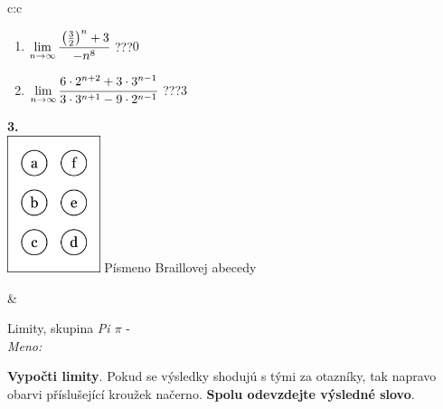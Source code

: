 \documentclass[10pt]{report}
\begin{document}
\begin{tabular}{c:c}
\begin{minipage}[c][104.5mm][t]{0.5\linewidth}
\begin{center}
\begin{minipage}{0.79\linewidth}
\begin{center}
\begin{varwidth}{\linewidth}
\begin{enumerate}
\item $\lim\limits_{n\to\infty}\cfrac{\left(\frac{3}{2}\right)^n +3}{-n^{8}}$\quad \dotfill\; ???\;\dotfill \quad $0$
\item $\lim\limits_{n\to\infty}\cfrac{6\cdot 2^{n+2}+3\cdot 3^{n-1}}{3\cdot 3^{n+1}-9\cdot 2^{n-1}}$\quad \dotfill\; ???\;\dotfill \quad $3$
\end{enumerate}
\end{varwidth}
\end{center}
\end{minipage}
\begin{minipage}{0.20\linewidth}
\begin{center}
{\Huge\bfseries 3.} \\[2mm]
\includegraphics[height=40mm]{../images/braille.png}
{\small Písmeno Braillovej abecedy}
\end{center}
\end{minipage}
\end{center}
\end{minipage}
&
\begin{minipage}[c][104.5mm][t]{0.5\linewidth}
\begin{center}
\vspace{7mm}
{\huge Limity, skupina \textit{Pi $\pi$} -}\\[5mm]
\textit{Meno:}\phantom{xxxxxxxxxxxxxxxxxxxxxxxxxxxxxxxxxxxxxxxxxxxxxxxxxxxxxxxxxxxxxxxxx}\\[5mm]
\begin{minipage}{0.95\linewidth}
\begin{center}
\textbf{Vypočti limity}. Pokud se výsledky shodujú s tými za otazníky, tak napravo\\obarvi příslušející kroužek načerno. \textbf{Spolu odevzdejte výsledné slovo}.
\end{center}
\end{minipage}
\\[1mm]
\begin{minipage}{0.79\linewidth}
\begin{center}
\begin{varwidth}{\linewidth}

\end{varwidth}
\end{center}
\end{minipage}
\end{center}
\end{minipage}
\end{tabular}
\end{document}

